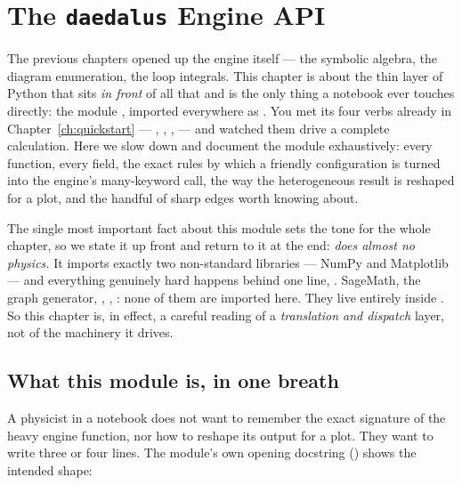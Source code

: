 \chapter{The \texttt{daedalus} Engine API}\label{ch:engine-api}

The previous chapters opened up the engine itself --- the symbolic algebra, the
diagram enumeration, the loop integrals. This chapter is about the thin layer of
Python that sits \emph{in front} of all that and is the only thing a notebook
ever touches directly: the module , imported
everywhere as . You met its four verbs already in
Chapter~\ref{ch:quickstart} --- , , ,
 --- and watched them drive a complete calculation. Here we
slow down and document the module exhaustively: every function, every
 field, the exact rules by which a friendly configuration is turned
into the engine's many-keyword call, the way the heterogeneous result is reshaped
for a plot, and the handful of sharp edges worth knowing about.

The single most important fact about this module sets the tone for the whole
chapter, so we state it up front and return to it at the end: \emph{
does almost no physics.} It imports exactly two non-standard libraries --- NumPy
and Matplotlib --- and everything genuinely hard happens behind one line,
. SageMath, the  graph
generator, , , : none of them are imported
here. They live entirely inside . So this chapter is, in
effect, a careful reading of a \emph{translation and dispatch} layer, not of the
machinery it drives.

\section{What this module is, in one breath}

A physicist in a notebook does not want to remember the exact signature of the
heavy engine function, nor how to reshape its output for a plot. They want to
write three or four lines. The module's own opening docstring
() shows the intended shape:

